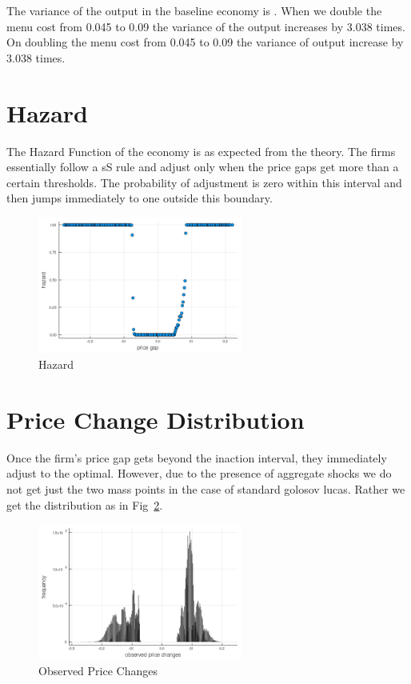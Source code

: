 The variance of the output in the baseline economy is . When we double the menu cost from 0.045 to 0.09 the variance of the output increases by 3.038 times.
On doubling the menu cost from 0.045 to 0.09 the variance of output increase by 3.038 times.

\section{Hazard}

The Hazard Function of the economy is as expected from the theory. The firms essentially follow a sS rule and adjust only when the price gaps get more than a certain thresholds. The probability of adjustment is zero within this interval and then jumps immediately to one outside this boundary.
\begin{figure}[H]
    \centering
    \includegraphics[width = 0.6\textwidth]{../tasks/Golosov_lucas/output/hazard_gl.png}
    \caption{Hazard}
    \label{}
\end{figure}

\section{Price Change Distribution}

Once the firm's price gap gets beyond the inaction interval, they immediately adjust to the optimal. However, due to the presence of aggregate shocks we do not get just the two mass points in the case of standard golosov lucas. Rather we get the distribution as in Fig~\ref{pcgl}.
\begin{figure}[H]
    \centering
    \includegraphics[width = 0.6\textwidth]{../tasks/Golosov_lucas/output/observed_p_changes_gl.png}
    \caption{Observed Price Changes}
    \label{pcgl}
\end{figure}

